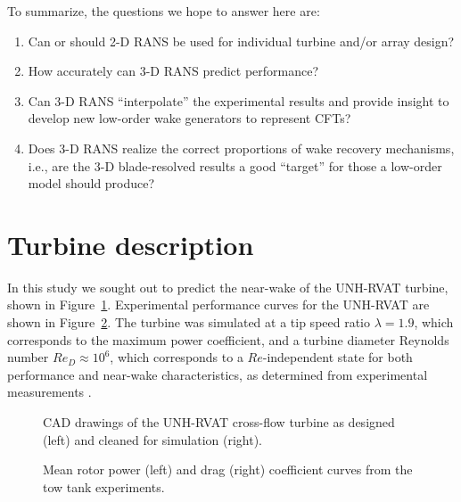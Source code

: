 To summarize, the questions we hope to answer here are:

\begin{enumerate}

    \item Can or should 2-D RANS be used for individual turbine and/or array
    design?

    \item How accurately can 3-D RANS predict performance?

    \item Can 3-D RANS ``interpolate'' the experimental results and provide
    insight to develop new low-order wake generators to represent CFTs?

    \item Does 3-D RANS realize the correct proportions of wake recovery
    mechanisms, i.e., are the 3-D blade-resolved results a good ``target'' for
    those a low-order model should produce?

\end{enumerate}


\section{Turbine description}

In this study we sought out to predict the near-wake of the UNH-RVAT turbine,
shown in Figure~\ref{fig:RVAT-CAD}. Experimental performance curves for the
UNH-RVAT are shown in Figure~\ref{fig:exp_perf}. The turbine was simulated at a
tip speed ratio $\lambda=1.9$, which corresponds to the maximum power
coefficient, and a turbine diameter Reynolds number $Re_D \approx 10^6$, which
corresponds to a $Re$-independent state for both performance and near-wake
characteristics, as determined from experimental measurements \cite{Bachant2014,
    Bachant2016-Energies}.


\begin{figure}[ht]
    \centering


    \caption{CAD drawings of the UNH-RVAT cross-flow turbine as designed (left)
        and cleaned for simulation (right).}

    \label{fig:RVAT-CAD}
\end{figure}


\begin{figure}[ht]
    \centering


    \caption{Mean rotor power (left) and drag (right) coefficient curves from
        the tow tank experiments\cite{Bachant2016-RVAT-Re-dep}.}

    \label{fig:exp_perf}
\end{figure}


